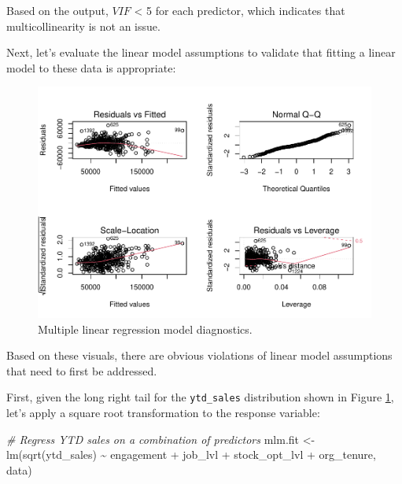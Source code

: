 \documentclass[
]{book}
\newenvironment{Shaded}{\begin{snugshade}}{\end{snugshade}}
\newcommand{\CommentTok}[1]{\textcolor[rgb]{0.56,0.35,0.01}{\textit{#1}}}
\newcommand{\FunctionTok}[1]{\textcolor[rgb]{0.00,0.00,0.00}{#1}}
\newcommand{\NormalTok}[1]{#1}
\newcommand{\OtherTok}[1]{\textcolor[rgb]{0.56,0.35,0.01}{#1}}
\newcommand{\SpecialCharTok}[1]{\textcolor[rgb]{0.00,0.00,0.00}{#1}}
\begin{document}
Based on the output, \(VIF\) \textless{} 5 for each predictor, which indicates that multicollinearity is not an issue.

Next, let's evaluate the linear model assumptions to validate that fitting a linear model to these data is appropriate:

\begin{figure}

{\centering \includegraphics[width=1\linewidth]{People_Analytics_Lifecycle_files/figure-latex/pre-mlm-diagnostics-1} 

}

\caption{Multiple linear regression model diagnostics.}\label{fig:pre-mlm-diagnostics}
\end{figure}

Based on these visuals, there are obvious violations of linear model assumptions that need to first be addressed.

First, given the long right tail for the \texttt{ytd\_sales} distribution shown in Figure \ref{fig:pre-mlm-diagnostics}, let's apply a square root transformation to the response variable:

\begin{Shaded}
\begin{Highlighting}[]
\CommentTok{\# Regress YTD sales on a combination of predictors}
\NormalTok{mlm.fit }\OtherTok{\textless{}{-}} \FunctionTok{lm}\NormalTok{(}\FunctionTok{sqrt}\NormalTok{(ytd\_sales) }\SpecialCharTok{\textasciitilde{}}\NormalTok{ engagement }\SpecialCharTok{+}\NormalTok{ job\_lvl }\SpecialCharTok{+}\NormalTok{ stock\_opt\_lvl }\SpecialCharTok{+}\NormalTok{ org\_tenure, data)}
\end{Highlighting}
\end{Shaded}
\end{document}
